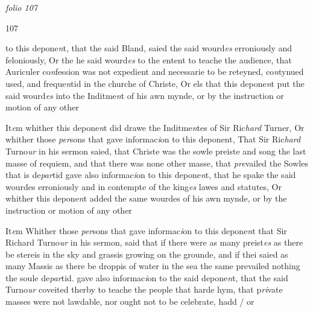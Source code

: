 \documentclass[12pt, a4paper]{book}
\begin{document}
\dotfill
					

\textit{folio 107}


\begin{flushright}{\color{Mahogany}107}\end{flushright}
 	
 		
		\ifthenelse{\isodd{\thepage}}
		{\reversemarginpar}
		{\normalmarginpar}
		
 			to this depone\textit{n}t, that the said Bland, saied the said wourd\textit{es}
 erroniously and feloniously, Or the he said wourd\textit{es} to the
 entent to teache the audience, that Auriculer co\textit{n}fession
 was not expedient and necessarie to be reteyned, co\textit{n}tynued
 used, and freque\textit{n}tid in the churche of Christe, Or els
 that this depone\textit{n}t put the said wourd\textit{es} into the Inditme\textit{n}t
 of his awn mynde, or by the instruction or motion of any
 other
 




				\marginpar[\vspace{0.5cm}{\textcolor{Gray}{7}}]{}
			
		\ifthenelse{\isodd{\thepage}}
		{\reversemarginpar}
		{\normalmarginpar}
		 It\textit{e}m whither this depone\textit{n}t did drawe the Inditme\textit{n}tes of Sir
 Ric\textit{hard} Turner, Or whither those \textit{per}sons that gave
	informac\textit{i}on to this deponent, That Sir Ric\textit{hard} Turno\textit{ur}
 in his sermon saied, that Christe was the sowle preiste
 and song the last masse of requiem, and that there was
 none other masse, that \textit{pre}vailed the Sowles that is de\textit{par}tid
 gave also informac\textit{i}on to this depone\textit{n}t, that he spake the said
 wourdes erroniously and in contempte of the king\textit{es} lawes
 and statutes, Or whither this depone\textit{n}t added the same
 wourdes of his awn mynde, or by the instruction or motion
 of any other
 




				\marginpar[\vspace{0.5cm}{\textcolor{Gray}{8}}]{}
			
		\ifthenelse{\isodd{\thepage}}
		{\reversemarginpar}
		{\normalmarginpar}
		 It\textit{e}m Whither those \textit{per}sons that gave informac\textit{i}on to this depone\textit{n}t
	that Sir Richard Turno\textit{ur} in his sermon, said that if
 there were as many preist\textit{es} as there be stereis in the sky
 and grassis growing on the grounde, and if thei saied
 as many Massis as there be droppis of water in the sea
 the same prevailed nothing the soule de\textit{par}tid. gave also
	informac\textit{i}on to the said depone\textit{n}t, that the said Turno\textit{ur} coveited
 therby to teache the people that harde hym, that p\textit{ri}vate masses
 were not lawdable, nor ought not to be celebrate, hadd / or
\end{document}
